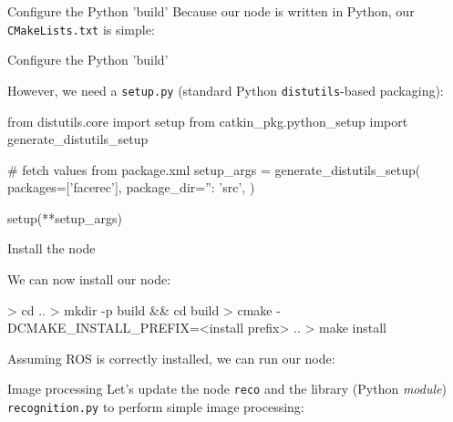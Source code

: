 \documentclass[compress]{beamer}
\begin{document}
{\begin{frame}[fragile]{Configure the Python 'build'}
Because our node is written in Python, our \texttt{CMakeLists.txt} is simple:

\end{frame}

\begin{frame}[fragile]{Configure the Python 'build'}

However, we need a \texttt{setup.py} (standard Python
    \texttt{distutils}-based packaging):

\begin{pythoncode}
from distutils.core import setup
from catkin_pkg.python_setup import generate_distutils_setup

# fetch values from package.xml
setup_args = generate_distutils_setup(
                    packages=['facerec'],
                    package_dir={'': 'src'},
                )

setup(**setup_args)
\end{pythoncode}

\end{frame}

\begin{frame}[fragile]{Install the node}

    We can now install our node:

\begin{shcode}
> cd ..
> mkdir -p build && cd build
> cmake -DCMAKE_INSTALL_PREFIX=<install prefix> ..
> make install
\end{shcode}

\pause

Assuming ROS is correctly installed, we can run our node:



\end{frame}

\begin{frame}[fragile]{Image processing}
Let's update the node \texttt{reco} and the library (Python \emph{module})
    \texttt{recognition.py} to perform simple image processing:


\end{frame}}
\end{document}
